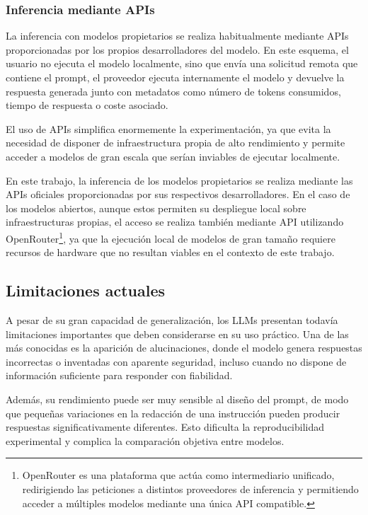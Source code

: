 \subsubsection{Inferencia mediante APIs}

La inferencia con modelos propietarios se realiza habitualmente mediante \acp{API} proporcionadas por los propios desarrolladores del modelo. En este esquema, el usuario no ejecuta el modelo localmente, sino que envía una solicitud remota que contiene el prompt, el proveedor ejecuta internamente el modelo y devuelve la respuesta generada junto con metadatos como número de tokens consumidos, tiempo de respuesta o coste asociado.

El uso de \acp{API} simplifica enormemente la experimentación, ya que evita la necesidad de disponer de infraestructura propia de alto rendimiento y permite acceder a modelos de gran escala que serían inviables de ejecutar localmente. 

En este trabajo, la inferencia de los modelos propietarios se realiza mediante las \acp{API} oficiales proporcionadas por sus respectivos desarrolladores. En el caso de los modelos abiertos, aunque estos permiten su despliegue local sobre infraestructuras propias, el acceso se realiza también mediante \ac{API} utilizando OpenRouter\footnote{OpenRouter es una plataforma que actúa como intermediario unificado, redirigiendo las peticiones a distintos proveedores de inferencia y permitiendo acceder a múltiples modelos mediante una única \ac{API} compatible.}, ya que la ejecución local de modelos de gran tamaño requiere recursos de hardware que no resultan viables en el contexto de este trabajo.

\subsection{Limitaciones actuales}

A pesar de su gran capacidad de generalización, los \acp{LLM} presentan todavía limitaciones importantes que deben considerarse en su uso práctico. Una de las más conocidas es la aparición de alucinaciones, donde el modelo genera respuestas incorrectas o inventadas con aparente seguridad, incluso cuando no dispone de información suficiente para responder con fiabilidad.

Además, su rendimiento puede ser muy sensible al diseño del prompt, de modo que pequeñas variaciones en la redacción de una instrucción pueden producir respuestas significativamente diferentes. Esto dificulta la reproducibilidad experimental y complica la comparación objetiva entre modelos.


